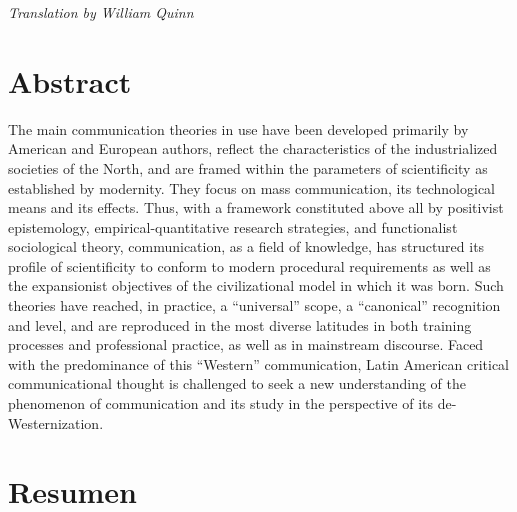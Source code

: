 \documentclass{tufte-handout}
\begin{document}
\begin{titlepage}
\begin{fullwidth}
\end{fullwidth}

\vspace*{1em}




\noindent\emph{Translation by William Quinn}

\hypertarget{abstract}{%
\section{Abstract}\label{abstract}}

The main communication theories in use have been developed primarily by
American and European authors, reflect the characteristics of the
industrialized societies of the North, and are framed within the
parameters of scientificity as established by modernity. They focus on
mass communication, its technological means and its effects. Thus, with
a framework constituted above all by positivist epistemology,
empirical-quantitative research strategies, and functionalist
sociological theory, communication, as a field of knowledge, has
structured its profile of scientificity to conform to modern procedural
requirements as well as the expansionist objectives of the
civilizational model in which it was born. Such theories have reached,
in practice, a ``universal'' scope, a ``canonical'' recognition and
level, and are reproduced in the most diverse latitudes in both training
processes and professional practice, as well as in mainstream discourse.
Faced with the predominance of this ``Western'' communication, Latin
American critical communicational thought is challenged to seek a new
understanding of the phenomenon of communication and its study in the
perspective of its de-Westernization. 

\vspace*{6em}


\hypertarget{resumen}{%
\section{Resumen}\label{resumen}}


\end{titlepage}
\end{document}
